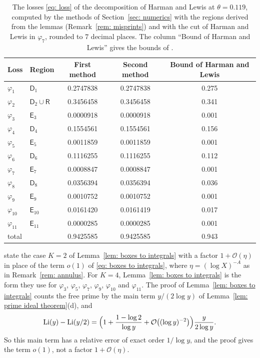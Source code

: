 \documentclass{article}
\numberwithin{equation}{section}
\begin{document}
\begin{table}[ht]
\centering
\begin{tabular}{llccc}
\toprule
Loss & Region & First method & Second method & Bound of Harman and Lewis \\
\midrule
$\varphi_1$ & $\mathsf{D}_1$ & 0.2747838 & 0.2747838 & 0.275 \\
$\varphi_2$ & $\mathsf{D}_2 \cup \mathsf{R}$ & 0.3456458 & 0.3456458 & 0.341 \\
$\varphi_3$ & $\mathsf{E}_3$ & 0.0000918 & 0.0000918 & 0.001 \\
$\varphi_4$ & $\mathsf{D}_4$ & 0.1554561 & 0.1554561 & 0.156 \\
$\varphi_5$ & $\mathsf{E}_5$ & 0.0011859 & 0.0011859 & 0.001 \\
$\varphi_6$ & $\mathsf{D}_6$ & 0.1116255 & 0.1116255 & 0.112 \\
$\varphi_7$ & $\mathsf{E}_7$ & 0.0008847 & 0.0008847 & 0.001 \\
$\varphi_8$ & $\mathsf{D}_8$ & 0.0356394 & 0.0356394 & 0.036 \\
$\varphi_9$ & $\mathsf{E}_9$ & 0.0010752 & 0.0010752 & 0.001 \\
$\varphi_{10}$ & $\mathsf{E}_{10}$ & 0.0161420 & 0.0161419 & 0.017 \\
$\varphi_{11}$ & $\mathsf{E}_{11}$ & 0.0000285 & 0.0000285 & 0.001 \\
\midrule
total & & 0.9425585 & 0.9425585 & 0.943 \\
\bottomrule
\end{tabular}
\caption{The losses \eqref{eq: loss} of the decomposition of Harman and Lewis at $\theta = 0.119$, computed by the methods of Section~\ref{sec: numerics} with the regions derived from the lemmas (Remark~\ref{rem: misprints}) and with the cut of Harman and Lewis in $\varphi_7$, rounded to $7$ decimal places. The column ``Bound of Harman and Lewis'' gives the bounds of \citet[pp.~132--134]{harman2001gaussian}.}
\label{tab: hl 0119}
\end{table}

\citet[(17)]{harman2001gaussian} state the case $K = 2$ of Lemma~\ref{lem: boxes to integrals} with a factor $1 + \mathcal{O}(\eta)$ in place of the term $o(1)$ of \eqref{eq: boxes to integrals}, where $\eta = (\log X)^{-A}$ as in Remark~\ref{rem: annulus}. For $K = 4$, Lemma~\ref{lem: boxes to integrals} is the form they use for $\varphi_3$, $\varphi_5$, $\varphi_7$, $\varphi_9$, $\varphi_{10}$ and $\varphi_{11}$. The proof of Lemma~\ref{lem: boxes to integrals} counts the free prime by the main term $y/(2\log y)$ of Lemma~\ref{lem: prime ideal theorem}(d), and
\begin{equation*}
\mathrm{Li}(y) - \mathrm{Li}(y/2) = \Bigl( 1 + \frac{1 - \log 2}{\log y} + \mathcal{O}\bigl((\log y)^{-2}\bigr) \Bigr) \frac{y}{2\log y}.
\end{equation*} So this main term has a relative error of exact order $1/\log y$, and the proof gives the term $o(1)$, not a factor $1 + \mathcal{O}(\eta)$.
\end{document}
